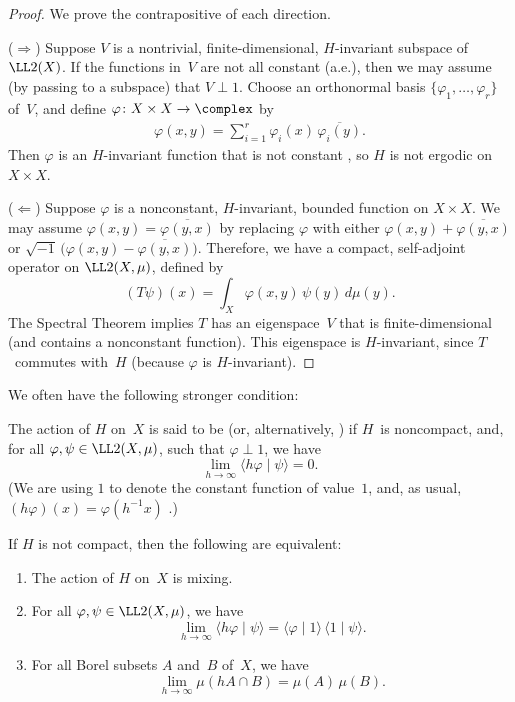 \begin{proof}
We prove the contrapositive of each direction.

($\Rightarrow$)
Suppose $V$ is a nontrivial, finite-dimensional, $H$-invariant subspace of $\LL2(X)$. If the functions in~$V$ are not all constant (a.e.), then we may assume (by passing to a subspace) that $V \perp 1$. Choose an orthonormal basis $\{\varphi_1,\ldots,\varphi_r\}$ of~$V$, and define $\varphi \colon X \times X \to \complex$ by
	\begin{align} \label{WMIffPf-DefinePhi}
	 \varphi(x,y) = \sum_{i=1}^r \varphi_i(x) \, \overline{\varphi_i(y)} 
	 . \end{align}
Then $\varphi$ is an $H$-invariant function that is not constant , so $H$ is not ergodic on $X \times X$.

($\Leftarrow$) Suppose $\varphi$ is a nonconstant, $H$-invariant, bounded function on $X \times X$. We may assume $\varphi(x,y) = \overline{\varphi(y,x)}$ by replacing $\varphi$ with either $\varphi(x,y) + \overline{\varphi(y,x)}$ or $\sqrt{-1} \, \bigl( \varphi(x,y) - \overline{\varphi(y,x)} \bigr)$. Therefore, we have a compact, self-adjoint operator on $\LL2(X,\mu)$, defined by
	$$ (T \psi)(x) = \int_X \varphi(x,y) \, \psi(y) \, d\mu(y) .$$
The Spectral Theorem  implies $T$ has an eigenspace~$V$ that is finite-dimensional (and contains a nonconstant function). This eigenspace is $H$-invariant, since $T$~commutes with~$H$ (because $\varphi$ is $H$-invariant).
\end{proof}

We often have the following stronger condition:

\begin{defn} \label{StrongMixingDefn}
The action of $H$ on~$X$ is said to be  (or, alternatively, ) if $H$~is noncompact, and, for all $\varphi,\psi \in \LL2(X,\mu)$, such that $\varphi \perp 1$, we have
	$$ \lim_{h \to \infty} \langle h \varphi \mid \psi \rangle = 0 .$$
(We are using $1$ to denote the constant function of value~$1$, and, as usual, $(h \varphi)(x) = \varphi(h^{-1} x)$ .)
\end{defn}

\begin{prop} \label{MixingIff}
If $H$ is not compact, then the following are equivalent:
	\begin{enumerate}
	\item \label{MixingIff-mixing}
	The action of $H$ on~$X$ is mixing.
	\item \label{MixingIff-funcs}
	For all $\varphi,\psi \in \LL2(X,\mu)$, we have
	$$ \lim_{h \to \infty} \langle h \varphi \mid \psi \rangle = \langle \varphi \mid 1 \rangle \, \langle 1 \mid \psi \rangle .$$
	\item \label{MixingIff-sets}
	For all Borel subsets $A$ and~$B$ of~$X$, we have
		$$ \lim_{h \to \infty} \mu(hA \cap B) = \mu(A) \, \mu(B) .$$ 
	\end{enumerate}
\end{prop}

